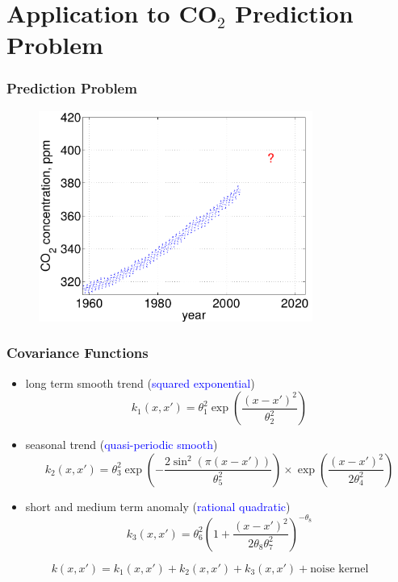 \documentclass[10pt]{beamer}
\begin{document}
  \section{Application to CO$_2$ Prediction Problem}

  \begin{frame}
    \frametitle{Prediction Problem}

    \begin{figure}
      \centering
      \includegraphics[width=0.8\textwidth]{prediction1.png}
    \end{figure}
  \end{frame}

  \begin{frame}
    \frametitle{Covariance Functions}

    \begin{itemize}
      \item long term smooth trend (\textcolor{blue}{squared exponential})
        \begin{equation*}
          k_1(x,x') = \theta_1^2 \exp \left( \frac{(x - x')^2}{\theta_2^2} \right)
        \end{equation*}
      \item seasonal trend (\textcolor{blue}{quasi-periodic smooth})
        \begin{equation*}
          k_2(x,x') = \theta_3^2 \exp \left( - \frac{2 \sin^2 (\pi (x - x'))}{\theta_5^2} \right) \times \exp \left( \frac{(x - x')^2}{2 \theta_4^2} \right)
        \end{equation*}
      \item short and medium term anomaly (\textcolor{blue}{rational quadratic})
        \begin{equation*}
          k_3(x,x') = \theta_6^2 \left( 1 + \frac{(x - x')^2}{2 \theta_8 \theta_7^2} \right)^{- \theta_8}
        \end{equation*}
    \end{itemize}

    \begin{equation*}
      k(x,x') = k_1(x,x') + k_2(x,x') + k_3(x,x') + \text{noise kernel}
    \end{equation*}
  \end{frame}
\end{document}
